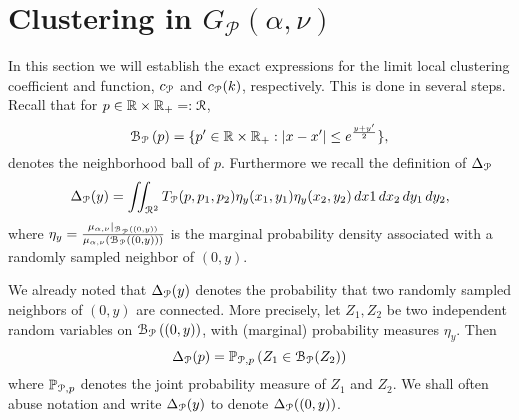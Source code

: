 \section{Clustering in $G_{\mathcal{P}}(\alpha, \nu)$}\label{sec:asymptotics_average_clustering_ast_P}

In this section we will establish the exact expressions for the limit local clustering coefficient and function, $c_{{\mathcal P}}$ and $c_{{\mathcal P}}(k)$, respectively. This is done in several steps. Recall that for $p\in {\ensuremath{\mathbb R}} \times {\ensuremath{\mathbb R}}_+ =: {\mathcal R}$,
\[
	{\mathcal B}_{{\mathcal P}}\left(p\right) = \{p^\prime \in {\ensuremath{\mathbb R}} \times {\ensuremath{\mathbb R}}_+ : |x - x^\prime| \le e^{\frac{y + y^\prime}{2}}\},
\]
denotes the neighborhood ball of $p$. Furthermore we recall the definition of $\Delta_{{\mathcal P}}$ 
\[
	\Delta_{{\mathcal P}}(y) = \iint_{{\mathcal R}^2} T_{{\mathcal P}}(p,p_1,p_2) \eta_{y}(x_1,y_1)\eta_{y}(x_2,y_2) \, dx1 \, dx_2 \, dy_1 \, dy_2,
\]
where $\eta_{y} = \frac{\mu_{\alpha,\nu}|_{{\mathcal B}_{{\mathcal P}}\left((0,y)\right)}}{\mu_{\alpha,\nu}\left({\mathcal B}_{{\mathcal P}}\left((0,y)\right)\right)}$ is the marginal probability density associated with a randomly sampled neighbor of $(0,y)$.

We already noted that $\Delta_{{\mathcal P}}(y)$ denotes the probability that two randomly sampled neighbors of $(0,y)$ are connected. More precisely, let $Z_{1}, Z_{2}$ be two independent random variables on ${\mathcal B}_{{\mathcal P}}\left((0,y)\right)$, with (marginal) probability measures $\eta_{y}$. Then
\begin{equation}\label{eq:def_delta_p_alt}
	\Delta_{{\mathcal P}}(p) = \mathbb{P}_{{\mathcal P},p}\left( Z_{1} \in \mathcal{B}_{{\mathcal P}}(Z_{2})\right)
\end{equation}
where $\mathbb{P}_{{\mathcal P},p}$ denotes the joint probability measure of $Z_1$ and $Z_2$. We shall often abuse notation and write $\Delta_{{\mathcal P}}(y)$ to denote $\Delta_{{\mathcal P}}((0,y))$. 


%


